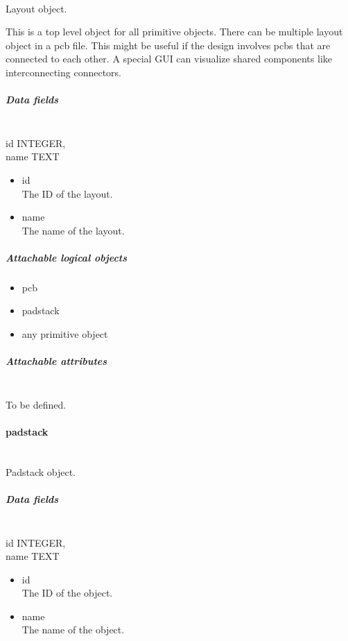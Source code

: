 \documentclass[12pt]{article}
\begin{document}
\mbox{}\\

Layout object.

This is a top level object for all primitive objects. There can be multiple
layout object in a pcb file. This might be useful if the design involves pcbs
that are connected to each other. A special GUI can visualize shared
components like interconnecting connectors.

\subparagraph{Data fields}\label{data-fields-7}

\mbox{}\\

id INTEGER,\\name TEXT

\begin{itemize}
\item
  id\\
The ID of the layout.
\item
  name\\
The name of the layout.
\end{itemize}

\subparagraph{Attachable logical objects}\label{attachable-logical-objects}

\begin{itemize}
\item
  pcb
\item
  padstack
\item
  any primitive object
\end{itemize}

\subparagraph{Attachable attributes}

\mbox{}\\

To be defined.

\paragraph{padstack}\label{padstack}

\mbox{}\\

Padstack object.

\subparagraph{Data fields}

\mbox{}\\

id INTEGER,\\
name TEXT

\begin{itemize}
\item id\\
The ID of the object.
\item name\\
The name of the object.
\end{itemize}
\end{document}
